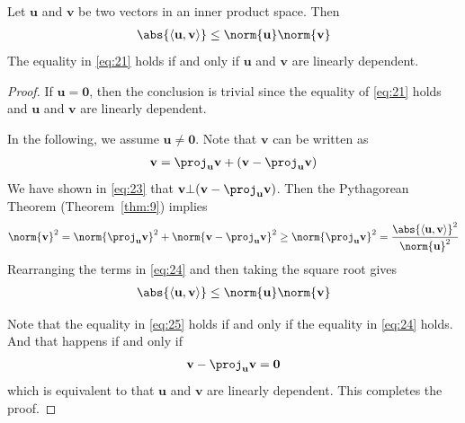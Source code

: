 \documentclass[thmcnt=section, color=blue, 12pt]{my-elegantbook}
\begin{document}

\begin{theorem} \label{thm:10}
    Let $\mathbf{u}$ and $\mathbf{v}$ be two vectors in an inner product space. Then 
    \begin{align}
        \abs{\left\langle \mathbf{u}, \mathbf{v} \right\rangle}
        \leq \norm{\mathbf{u}} \norm{\mathbf{v}}
        \label{eq:21}
    \end{align}
    The equality in \eqref{eq:21} holds if and only if $\mathbf{u}$ and $\mathbf{v}$ are linearly dependent.
\end{theorem}

\begin{proof}
    If $\mathbf{u} = \mathbf{0}$, then the conclusion is trivial since the equality of \eqref{eq:21} holds and $\mathbf{u}$ and $\mathbf{v}$ are linearly dependent.

    \par In the following, we assume $\mathbf{u} \neq \mathbf{0}$. Note that $\mathbf{v}$ can be written as 
    \begin{align*}
        \mathbf{v} = \proj_{\mathbf{u}} \mathbf{v} + (\mathbf{v} - \proj_{\mathbf{u}} \mathbf{v})
    \end{align*}
    We have shown in \eqref{eq:23} that $\mathbf{v} \bot (\mathbf{v} - \proj_{\mathbf{u}} \mathbf{v})$. Then the Pythagorean Theorem (Theorem~\ref{thm:9}) implies 
    \begin{align}
        \norm{\mathbf{v}}^2
        = \norm{\proj_{\mathbf{u}} \mathbf{v}}^2 + \norm{\mathbf{v} - \proj_{\mathbf{u}} \mathbf{v}}^2
        \geq \norm{\proj_{\mathbf{u}} \mathbf{v}}^2
        = \frac{\abs{\left\langle \mathbf{u}, \mathbf{v} \right\rangle}^2}{\norm{\mathbf{u}}^2}
        \label{eq:24}
    \end{align}
    Rearranging the terms in \eqref{eq:24} and then taking the square root gives 
    \begin{align}
        \abs{\left\langle \mathbf{u}, \mathbf{v} \right\rangle} \leq \norm{\mathbf{u}} \norm{\mathbf{v}}
        \label{eq:25}
    \end{align}

    \par Note that the equality in \eqref{eq:25} holds if and only if the equality in \eqref{eq:24} holds. And that happens if and only if 
    \begin{align*}
        \mathbf{v} - \proj_{\mathbf{u}} \mathbf{v} = \mathbf{0}
    \end{align*}
    which is equivalent to that $\mathbf{u}$ and $\mathbf{v}$ are linearly dependent. This completes the proof. 
\end{proof}
\end{document}

